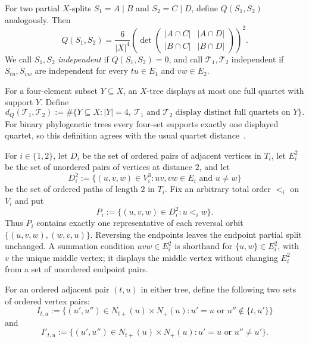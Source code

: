 \documentclass[12pt]{article}
\begin{document}
For two partial $X$-splits $S_1=A\mid B$ and $S_2=C\mid D$, define
$Q(S_1,S_2)$ analogously.  Then
\begin{equation}\label{eq:split-covariance}
 Q(S_1,S_2)=\frac6{|X|^4}
 \left(\det\!\begin{pmatrix}
 |A\cap C|&|A\cap D|\\
 |B\cap C|&|B\cap D|
 \end{pmatrix}
 \right)^2.
\end{equation}
We call $S_1,S_2$ \emph{independent} if $Q(S_1,S_2)=0$, and call
$\mathcal T_1,\mathcal T_2$ independent if $S_{tu},S_{vw}$ are
independent for every $tu\in E_1$ and $vw\in E_2$.

For a four-element subset $Y\subseteq X$, an $X$-tree displays at most one
full quartet with support $Y$.  Define
\begin{equation}\label{eq:quartet-distance-definition}
d_Q(\mathcal T_1,\mathcal T_2)
:=\#\{Y\subseteq X:|Y|=4,\ \mathcal T_1\text{ and }\mathcal T_2
\text{ display distinct full quartets on }Y\}.
\end{equation}
For binary phylogenetic trees every four-set supports exactly one displayed
quartet, so this definition agrees with the usual quartet
distance~\cite{SteelPenny1993}.

For $i\in\{1,2\}$, let $D_i$
be the set of ordered pairs of adjacent vertices in $T_i$, let $E_i^2$
be the set of unordered pairs of vertices at distance $2$, and let
\begin{equation}\label{eq:ordered-two-paths}
 D_i^2:=\{(u,v,w)\in V_i^3:uv,vw\in E_i\text{ and }u\ne w\}
\end{equation}
be the set of ordered paths of length $2$ in $T_i$.  Fix an arbitrary total
order $<_i$ on $V_i$ and put
\begin{equation}\label{eq:path-representatives}
 P_i:=\{(u,v,w)\in D_i^2:u<_i w\}.
\end{equation}
Thus $P_i$ contains exactly one representative of each reversal orbit
$\{(u,v,w),(w,v,u)\}$.  Reversing the endpoints leaves the endpoint partial
split unchanged.  A summation condition $uvw\in E_i^2$ is shorthand for
$\{u,w\}\in E_i^2$, with $v$ the unique middle vertex; it displays the middle
vertex without changing $E_i^2$ from a set of unordered endpoint pairs.

For an ordered adjacent pair $(t,u)$ in either tree, define the
following two sets of ordered vertex pairs:
\begin{equation}\label{eq:local-index-set}
 I_{t,u}:=\{(u',u'')\in N_{t+}(u)\times N_+(u):
 u'=u\text{ or }u''\notin\{t,u'\}\}
\end{equation}
and
\begin{equation}\label{eq:extended-index-set}
 I'_{t,u}:=\{(u',u'')\in N_{t+}(u)\times N_+(u):
 u'=u\text{ or }u''\ne u'\}.
\end{equation}
\end{document}
